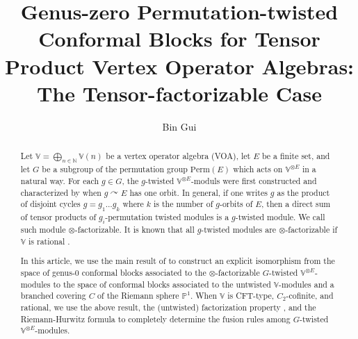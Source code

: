 \documentclass[12pt,a4paper,notitlepage]{article}
\title{Genus-zero Permutation-twisted Conformal Blocks for Tensor Product Vertex Operator Algebras: The Tensor-factorizable Case}
\author{{\sc Bin Gui}
}
\date{}
\theoremstyle{definition}
\theoremstyle{plain}
\newcommand{\Vbb}{\mathbb V}
\newcommand{\Nbb}{\mathbb N}
\newcommand{\Pbb}{\mathbb P}
\newcommand{\Perm}{\mathrm{Perm}}
\numberwithin{equation}{subsection}
\begin{document}
\sloppy %
	\setcounter{section}{-1}
	
	
	
	\maketitle
	
	
\newcommand\blfootnote[1]{%
	\begingroup
	\renewcommand\thefootnote{}\footnote{#1}%
	\addtocounter{footnote}{-1}%
	\endgroup
}



\begin{abstract}
Let $\Vbb=\bigoplus_{n\in\Nbb}\Vbb(n)$ be a  vertex operator algebra (VOA),  let $E$ be a finite set, and let $G$ be a subgroup of the permutation group $\Perm(E)$ which acts on $\Vbb^{\otimes E}$ in a natural way. For each $g\in G$, the $g$-twisted $\Vbb^{\otimes E}$-moduls were first constructed and characterized by \cite{BDM02} when $g\curvearrowright E$ has one orbit. In general, if one writes $g$ as the product of disjoint cycles $g=g_1\dots g_k$ where $k$ is the number of $g$-orbits of $E$, then a direct sum of tensor products of $g_i$-permutation twisted modules is a $g$-twisted module. We call such module $\otimes$-factorizable. It is known that  all $g$-twisted modules are $\otimes$-factorizable if $\Vbb$ is rational \cite{BDM02}.

In this article, we use the main result of \cite{Gui21b} to construct an explicit isomorphism from the space of genus-$0$ conformal blocks associated to the $\otimes$-factorizable $G$-twisted $\Vbb^{\otimes E}$-modules to the space of conformal blocks associated to the untwisted $\Vbb$-modules and a branched covering $C$ of the Riemann sphere $\Pbb^1$. When $\Vbb$ is CFT-type, $C_2$-cofinite, and rational, we use the above result, the (untwisted) factorization property \cite{DGT19b}, and the Riemann-Hurwitz formula to completely determine the fusion rules among $G$-twisted $\Vbb^{\otimes E}$-modules. 


\end{abstract}
\end{document}
